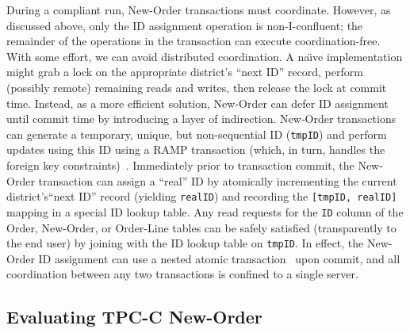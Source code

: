 During a compliant run, New-Order transactions must
coordinate. However, as discussed above, only the ID assignment
operation is non-I-confluent; the remainder of the operations in the
transaction can execute coordination-free. With some effort, we can
avoid distributed coordination. A na\"{\i}ve implementation might grab
a lock on the appropriate district's ``next ID'' record, perform
(possibly remote) remaining reads and writes, then release the lock at
commit time. Instead, as a more efficient solution, New-Order can
defer ID assignment until commit time by introducing a layer of
indirection. New-Order transactions can generate a temporary, unique,
but non-sequential ID (\texttt{tmpID}) and perform updates using this
ID using a RAMP transaction (which, in turn, handles the foreign key
constraints)~\cite{ramp-txns}. Immediately prior to transaction
commit, the New-Order transaction can assign a ``real'' ID by
atomically incrementing the current district's``next ID'' record
(yielding \texttt{realID}) and recording the \texttt{[tmpID, realID]}
mapping in a special ID lookup table. Any read requests for the
\texttt{ID} column of the Order, New-Order, or Order-Line tables can
be safely satisfied (transparently to the end user) by joining with
the ID lookup table on \texttt{tmpID}. In effect, the New-Order ID
assignment can use a nested atomic
transaction~\cite{atomictransactions} upon commit, and all
coordination between any two transactions is confined to a
single server.

\subsection{Evaluating TPC-C New-Order}
\label{sec:evaltpcc}


